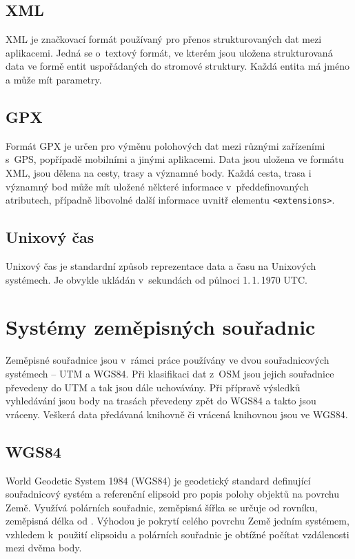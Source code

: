 \subsection{XML}
XML \cite{XML} je značkovací formát používaný pro přenos strukturovaných dat
mezi aplikacemi. Jedná se o~textový formát, ve kterém jsou uložena strukturovaná
data ve formě entit uspořádaných do stromové struktury. Každá entita má jméno a
může mít parametry. 

\subsection{GPX}
Formát GPX \cite{GPX} je určen pro výměnu polohových dat mezi různými zařízeními s~GPS,
popřípadě mobilními a jinými aplikacemi. Data jsou uložena ve formátu XML, jsou
dělena na cesty, trasy a významné body. Každá cesta, trasa i významný bod může
mít uložené některé informace v~předdefinovaných atributech, případně libovolné
další informace uvnitř elementu {\tt <extensions>}. 

\subsection{Unixový čas}
Unixový čas je standardní způsob reprezentace data a času na Unixových
systémech. Je obvykle ukládán v~sekundách od půlnoci 1.\,1.\,1970 UTC.

\section{Systémy zeměpisných souřadnic}
Zeměpisné souřadnice jsou v~rámci práce používány ve dvou souřadnicových
systémech -- UTM a WGS84. Při klasifikaci dat z~OSM jsou jejich souřadnice
převedeny do UTM a tak jsou dále uchovávány. Při přípravě výsledků vyhledávání
jsou body na trasách převedeny zpět do WGS84 a takto jsou vráceny. Veškerá data
předávaná knihovně či vrácená knihovnou jsou ve WGS84.
\subsection{WGS84}
World Geodetic System 1984 (WGS84) \cite{WGS84} je geodetický standard
definující souřadnicový systém a referenční elipsoid pro popis polohy objektů na
povrchu Země. Využívá polárních souřadnic, zeměpisná šířka se určuje od rovníku,
zeměpisná délka od . Výhodou je pokrytí celého
povrchu Země jedním systémem, vzhledem k~použití elipsoidu a polárních souřadnic
je obtížné počítat vzdálenosti mezi dvěma body.
